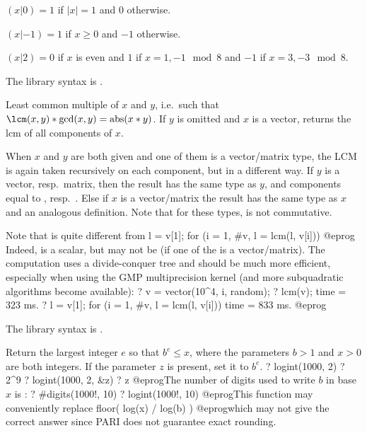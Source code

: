\item $(x|0) = 1$ if $|x| = 1$ and $0$ otherwise.

\item $(x|-1) = 1$ if $x \geq 0$ and $-1$ otherwise.

\item $(x|2) = 0$ if $x$ is even and $1$ if $x = 1,-1 \mod 8$ and $-1$
if $x=3,-3 \mod 8$.

The library syntax is .

\label{se:lcm}
Least common multiple of $x$ and $y$, i.e.~such
that $\lcm(x,y)*\gcd(x,y) = \text{abs}(x*y)$. If $y$ is omitted and $x$
is a vector, returns the $\text{lcm}$ of all components of $x$.

When $x$ and $y$ are both given and one of them is a vector/matrix type,
the LCM is again taken recursively on each component, but in a different way.
If $y$ is a vector, resp.~matrix, then the result has the same type as $y$,
and components equal to , resp.~. Else
if $x$ is a vector/matrix the result has the same type as $x$ and an
analogous definition. Note that for these types,  is not
commutative.

Note that  is quite different from
\bprog
l = v[1]; for (i = 1, #v, l = lcm(l, v[i]))
@eprog\noindent
Indeed,  is a scalar, but  may not be (if one of
the  is a vector/matrix). The computation uses a divide-conquer tree
and should be much more efficient, especially when using the GMP
multiprecision kernel (and more subquadratic algorithms become available):
\bprog
? v = vector(10^4, i, random);
? lcm(v);
time = 323 ms.
? l = v[1]; for (i = 1, #v, l = lcm(l, v[i]))
time = 833 ms.
@eprog

The library syntax is .

\label{se:logint}
Return the largest integer $e$ so that $b^e \leq x$, where the
parameters $b > 1$ and $x > 0$ are both integers. If the parameter $z$ is
present, set it to $b^e$.
\bprog
? logint(1000, 2)
? 2^9
? logint(1000, 2, &z)
? z
@eprog\noindent The number of digits used to write $b$ in base $x$ is
:
\bprog
? #digits(1000!, 10)
? logint(1000!, 10)
@eprog\noindent This function may conveniently replace
\bprog
  floor( log(x) / log(b) )
@eprog\noindent which may not give the correct answer since PARI
does not guarantee exact rounding.

